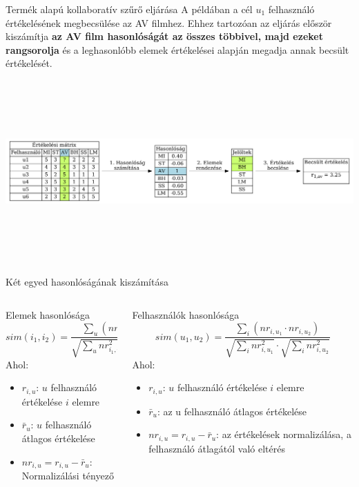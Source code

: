 \documentclass[english, aspectratio=169]{beamer}
\begin{document}
\begin{frame}{Termék alapú kollaboratív szűrő eljárása}
A példában a cél $u_1$ felhasználó értékelésének megbecsülése az AV filmhez. Ehhez tartozóan  az eljárás először kiszámítja \textbf{az AV film hasonlóságát az összes többivel, majd ezeket rangsorolja} és a leghasonlóbb elemek értékelései alapján megadja annak becsült értékelését.\par\medskip
\begin{center}
\includegraphics[width=14cm, height=7cm, keepaspectratio]{graphs/recommender_5.png}
\end{center}
\end{frame}

\begin{frame}{Két egyed hasonlóságának kiszámítása}
\begin{columns}
\begin{column}{.5\textwidth}
\begin{block}{Elemek hasonlósága}
\[
sim\left( i_1,i_2 \right) = \frac{\sum_u\left( nr_{i_1,u} \cdot nr_{i_2,u} \right)}{\sqrt{\sum_u nr^2_{i_1,u}} \cdot \sqrt{\sum_u nr^2_{i_2,u}}}
\]
Ahol:
\begin{itemize}
	\item $r_{i,u}$: $u$ felhasználó értékelése $i$ elemre
	\item $\bar{r}_u$: $u$ felhasználó átlagos értékelése
	\item $nr_{i,u}=r_{i,u} - \bar{r}_u$: Normalizálási tényező
\end{itemize}
\end{block}
\end{column}
\begin{column}{.5\textwidth}
\begin{block}{Felhasználók hasonlósága}
\[
sim\left(u_1, u_2\right) = \frac{\sum_{i} (nr_{i,u_1} \cdot nr_{i,u_2})}
{\sqrt{\sum_{i} nr_{i,u_1}^2} \cdot \sqrt{\sum_{i} nr_{i,u_2}^2}}
\]
Ahol:
\begin{itemize}
    \item \( r_{i,u} \): $u$ felhasználó értékelése $i$ elemre
    \item \( \bar{r}_u \): az u felhasználó átlagos értékelése
    \item \( nr_{i,u} = r_{i,u} - \bar{r}_u \): az értékelések normalizálása, a felhasználó átlagától való eltérés
\end{itemize}
\end{block}
\end{column}
\end{columns}
\end{frame}
\end{document}
